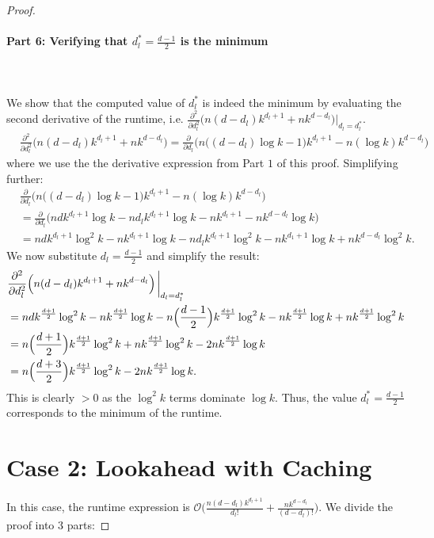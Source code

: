 \begin{proof}
\paragraph{Part 6: Verifying that $d_l^* = \frac{d-1}{2}$ is the minimum}\leavevmode\leavevmode\\\\
We show that the computed value of $d_l^*$ is indeed the minimum by evaluating the second derivative of the runtime, i.e. $\frac{\partial^2}{\partial d_l^2}\Big(n(d-d_l)k^{d_l+1} + nk^{d - d_l}\Big)|_{d_l = d_l^*}$. 
\begin{align}
    &\frac{\partial^2}{\partial d_l^2}\Big(n(d-d_l)k^{d_l+1} + nk^{d - d_l}\Big) = \frac{\partial}{\partial d_l}\Big(n\big((d-d_l)\log k - 1\big) k^{d_l+1} - n(\log k) k^{d-d_l}\Big)
\end{align}
where we use the the derivative expression from Part $1$ of this proof. Simplifying further:
\begin{align}
    &\frac{\partial}{\partial d_l}\Big(n\big((d-d_l)\log k - 1\big) k^{d_l+1} - n(\log k) k^{d-d_l}\Big) \\
    &= \frac{\partial}{\partial d_l}\Big(n d k^{d_l+1}\log k-nd_lk^{d_l+1}\log k -nk^{d_l+1}-nk^{d-d_l}\log k\Big)\\
    &= ndk^{d_l+1}\log^2 k - nk^{d_l+1}\log k - nd_lk^{d_l+1} \log^2 k -nk^{d_1+1} \log k + nk^{d-d_l} \log^2 k.
\end{align}
We now substitute $d_l = \frac{d-1}{2}$ and simplify the result:
\begin{align}
    &\frac{\partial^2}{\partial d_l^2}\Big(n(d-d_l)k^{d_l+1} + nk^{d - d_l}\Big)\eval_{d_l = d_l^*} \\
    &= ndk^{\frac{d+1}{2}}\log^2 k - nk^{\frac{d+1}{2}}\log k - n\Big(\frac{d-1}{2}\Big)k^{\frac{d+1}{2}} \log^2 k -nk^{\frac{d+1}{2}} \log k + nk^{\frac{d+1}{2}} \log^2 k\\
    &= n\Big(\frac{d+1}{2}\Big) k^{\frac{d+1}{2}}\log^2 k + nk^{\frac{d+1}{2}} \log^2 k - 2nk^{\frac{d+1}{2}}\log k \\
    &= n\Big(\frac{d+3}{2}\Big) k^{\frac{d+1}{2}}\log^2 k - 2nk^{\frac{d+1}{2}}\log k .
\end{align}
This is clearly $> 0$ as the $\log^2 k$ terms dominate $\log k$. Thus, the value $d_l^* = \frac{d-1}{2}$ corresponds to the minimum of the runtime. 
\section*{Case 2: Lookahead with Caching}
In this case, the runtime expression is $\mathcal{O}\Big(\frac{n(d-d_l)k^{d_l+1}}{d_l!} + \frac{nk^{d - d_l}}{(d-d_l)!}\Big)$. We divide the proof into $3$ parts:

\end{proof}
